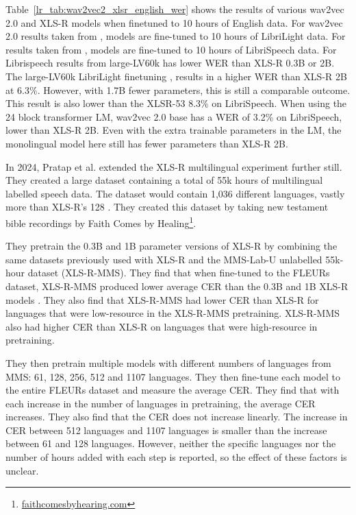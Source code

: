 Table~\ref{lr_tab:wav2vec2_xlsr_english_wer} shows the results of various wav2vec 2.0 and XLS-R models when finetuned to 10 hours of English data. For wav2vec 2.0 results taken from \cite{wav2vec}, models are fine-tuned to 10 hours of LibriLight data. For results taken from \cite{babu2021xlsr}, models are fine-tuned to 10 hours of LibriSpeech data. For Librispeech results from \cite{babu2021xlsr, librispeech} large-LV60k has lower WER than XLS-R 0.3B or 2B. The large-LV60k LibriLight finetuning \cite{wav2vec}, results in a higher WER than XLS-R 2B at 6.3\%. However, with 1.7B fewer parameters, this is still a comparable outcome. This result is also lower than the XLSR-53 8.3\% on LibriSpeech. When using the 24 block transformer LM, wav2vec 2.0 base has a WER of 3.2\% on LibriSpeech, lower than XLS-R 2B. Even with the extra trainable parameters in the LM, the monolingual model here still has fewer parameters than XLS-R 2B.

In 2024, Pratap et al. \cite{pratap2024scaling} extended the XLS-R multilingual experiment further still. They created a large dataset containing a total of 55k hours of multilingual labelled speech data. The dataset would contain 1,036 different languages, vastly more than XLS-R's 128 \cite{babu2021xlsr}. They created this dataset by taking new testament bible recordings by Faith Comes by Healing\footnote{\hyperlink{https://www.faithcomesbyhearing.com/}{faithcomesbyhearing.com}}.

They pretrain the 0.3B and 1B parameter versions of XLS-R by combining the same datasets previously used with XLS-R and the MMS-Lab-U unlabelled 55k-hour dataset (XLS-R-MMS). They find that when fine-tuned to the FLEURs \cite{FLEURS} dataset, XLS-R-MMS produced lower average CER than the 0.3B and 1B XLS-R models \cite{pratap2024scaling}. They also find that XLS-R-MMS had lower CER than XLS-R for languages that were low-resource in the XLS-R-MMS pretraining. XLS-R-MMS also had higher CER than XLS-R on languages that were high-resource in pretraining. 

They then pretrain multiple models with different numbers of languages from MMS: 61, 128, 256, 512 and 1107 languages. They then fine-tune each model to the entire FLEURs dataset and measure the average CER. They find that with each increase in the number of languages in pretraining, the average CER increases. They also find that the CER does not increase linearly. The increase in CER between 512 languages and 1107 languages is smaller than the increase between 61 and 128 languages. However, neither the specific languages nor the number of hours added with each step is reported, so the effect of these factors is unclear.

